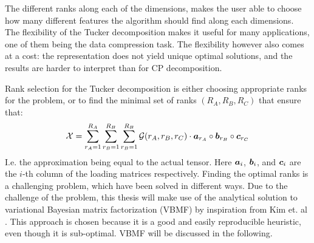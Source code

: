 The different ranks along each of the dimensions, makes the user able to choose how many different features the algorithm should find along each dimensions. The flexibility of the Tucker decomposition makes it useful for many applications, one of them being the data compression task. The flexibility however also comes at a cost: the representation does not yield unique optimal solutions, and the results are harder to interpret than for CP decomposition.

Rank selection for the Tucker decomposition is either choosing appropriate ranks for the problem, or to find the minimal set of ranks $(R_A, R_B, R_C)$ that ensure that:
\begin{equation}
    \mathcal{X} = \sum_{r_A=1}^{R_A} \sum_{r_B=1}^{R_B}
 \sum_{r_B=1}^{R_B} \mathcal{G}(r_A, r_B, r_C) \cdot \boldsymbol{a}_{r_A} \circ \boldsymbol{b}_{r_B} \circ \boldsymbol{c}_{r_C}
 \end{equation}
I.e. the approximation being equal to the actual tensor. Here $\boldsymbol{a}_i$, $\boldsymbol{b}_i$, and $\boldsymbol{c}_i$ are the $i$-th column of the loading matrices respectively. Finding the optimal ranks is a challenging problem, which have been solved in different ways. Due to the challenge of the problem, this thesis will make use of the analytical solution to variational Bayesian matrix factorization (VBMF) by inspiration from Kim et. al \cite{Kim2016}. This approach is chosen because it is a good and easily reproducible heuristic, even though it is sub-optimal. VBMF will be discussed in the following.

